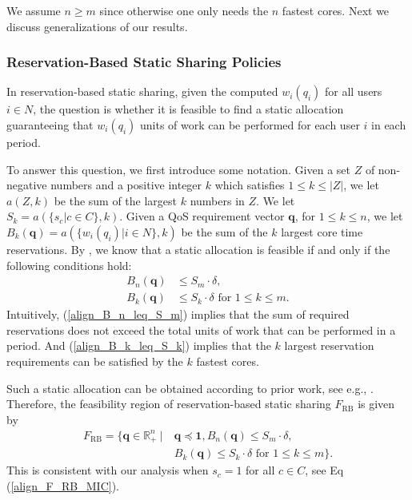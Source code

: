 \documentclass[prodmode,acmtompecs]{acmsmall}
\newcommand{\reqvec}{\mathbf{q}}
\newcommand{\reqscalar}{q}
\newcommand{\feasibilityRegion}{F}
\newcommand{\fullUserSet}{N}
\begin{document}
We assume $n \geq m$ since otherwise one only needs the $n$ fastest cores. 
Next we discuss generalizations of our results. 

\subsubsection{Reservation-Based Static Sharing Policies}

In reservation-based static sharing, given the computed $w_i(\reqscalar_i)$ for all users $i\in \fullUserSet$, the question is whether it is feasible to find a static allocation guaranteeing that $w_i(q_i)$ units of work can be performed for each user $i$ in each period. 

\newcommand{\sumFnName}{a}

To answer this question, we first introduce some notation. 
Given a set $Z$ of non-negative numbers and a positive integer $k$ which satisfies $1\leq k \leq |Z|$, we let $\sumFnName(Z, k)$ be the sum of the largest $k$ numbers in $Z$. 
We let $S_k = \sumFnName(\{s_c | c\in C \}, k)$. 
Given a QoS requirement vector $\reqvec$, for $1 \leq k \leq n$, we let $B_k(\reqvec) = \sumFnName(\{w_i(\reqscalar_i) | i\in \fullUserSet \}, k)$ be the sum of the $k$ largest core time reservations. 
By \cite{FGB01,FuM09}, we know that a static allocation is feasible if and only if the following conditions hold: 
\begin{align}
B_n(\reqvec) & \leq S_m \cdot \delta, \label{align_B_n_leq_S_m} \\
B_k(\reqvec) & \leq S_k \cdot \delta \text{~for~} 1 \leq k \leq m. 	\label{align_B_k_leq_S_k}
\end{align}
Intuitively, (\ref{align_B_n_leq_S_m}) implies that the sum of required reservations does not exceed the total units of work that can be performed in a period. 
And (\ref{align_B_k_leq_S_k}) implies that the $k$ largest reservation requirements can be satisfied by the $k$ fastest cores. 

Such a static allocation can be obtained according to prior work, see e.g., \cite{FGB01,FuM09}. 
Therefore, the feasibility region of reservation-based static sharing $\feasibilityRegion_\text{RB}$ is given by
\begin{align*}
\feasibilityRegion_{\text{RB}} = \{ \reqvec \in \mathbb R^n_+ ~|~ & \reqvec \preceq \mathbf{1},	B_n(\reqvec) \leq S_m \cdot \delta, 	\\
& B_k(\reqvec) \leq S_k \cdot \delta \text{~for~} 1 \leq k \leq m\}. 
\end{align*}
This is consistent with our analysis when $s_c = 1$ for all $c \in C$, see Eq (\ref{align_F_RB_MIC}). 
\end{document}

